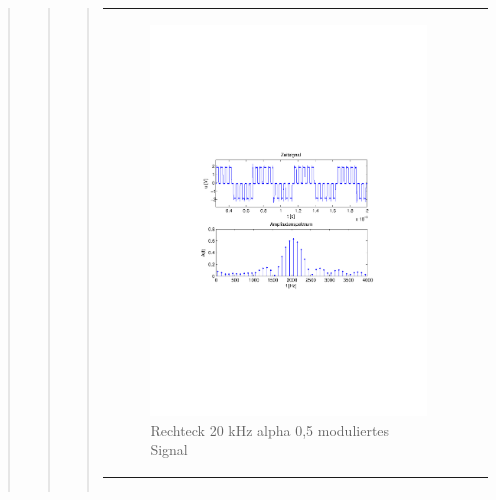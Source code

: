 \begin{quote}
\begin{quote}
\begin{quote}
\begin{center}
\begin{tabular}{ll}
                \begin{minipage}{0.6\textwidth}
                    \begin{figure}[H]
                        \includegraphics[scale=0.7, trim = 35mm 100mm 35mm 95mm, clip]{Bilder/shaperec20_05abget_zeit}
                       \caption{Rechteck 20 kHz alpha 0,5 moduliertes Signal}
		              \label{fig:shaperec20_05zeit}
                    \end{figure}
                \end{minipage}
            
            \end{tabular}
            \end{center}
            
            \begin{center}
            \begin{tabular}{ll}
            

\end{tabular}
\end{center}
\end{quote}
\end{quote}
\end{quote}
